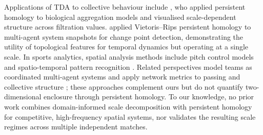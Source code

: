 Applications of TDA to collective behaviour include \citet{Topaz2015}, who applied persistent homology to biological aggregation models and visualised scale-dependent structure across filtration values. \citet{Gu2022} applied Vietoris--Rips persistent homology to multi-agent system snapshots for change point detection, demonstrating the utility of topological features for temporal dynamics but operating at a single scale. In sports analytics, spatial analysis methods include pitch control models \citep{FernandezBornn2018} and spatio-temporal pattern recognition \citep{Gudmundsson2017}. Related perspectives model teams as coordinated multi-agent systems \citep{Duarte2012} and apply network metrics to passing and collective structure \citep{Clemente2015, Buldu2019}; these approaches complement ours but do not quantify two-dimensional enclosure through persistent homology. To our knowledge, no prior work combines domain-informed scale decomposition with persistent homology for competitive, high-frequency spatial systems, nor validates the resulting scale regimes across multiple independent matches.
